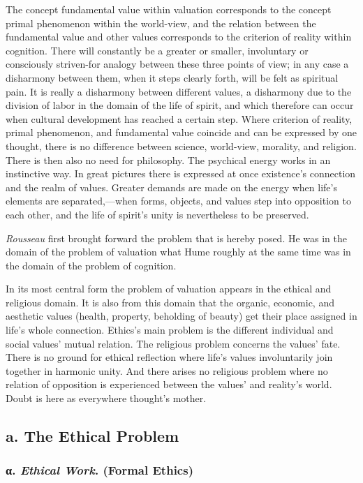 \documentclass[12pt,a4paper]{book}
\newcommand{\opage}[1]{\marginnote{\footnotesize\textit{[#1]}}}
\begin{document}
The concept fundamental value within valuation corresponds to \opage{349}the concept primal phenomenon within
the world-view, and the relation between the fundamental value and other values corresponds to the
criterion of reality within cognition. There will constantly be a greater or smaller, involuntary or
consciously striven-for analogy between these three points of view; in any case a disharmony between
them, when it steps clearly forth, will be felt as spiritual pain. It is really a disharmony between
different values, a disharmony due to the division of labor in the domain of the life of spirit, and
which therefore can occur when cultural development has reached a certain step. Where criterion of
reality, primal phenomenon, and fundamental value coincide and can be expressed by one thought, there
is no difference between science, world-view, morality, and religion. There is then also no need for
philosophy. The psychical energy works in an instinctive way. In great pictures there is expressed at
once existence's connection and the realm of values. Greater demands are made on the energy when
life's elements are separated,---when forms, objects, and values step into opposition to each other,
and the life of spirit's unity is nevertheless to be preserved.

\emph{Rousseau} first brought forward the problem that is hereby posed. He was in the domain of the
problem of valuation what Hume roughly at the same time was in the domain of the problem of cognition.

In its most central form the problem of valuation appears in the ethical and religious domain. It is
also from this domain that the organic, economic, and aesthetic values (health, property, beholding of
beauty) get their place assigned in life's whole connection. Ethics's main problem is the different
individual and social values' mutual relation. The religious problem concerns the values' fate. There
is no ground for ethical reflection where life's values involuntarily join together in harmonic unity.
And there arises no religious problem where no relation of opposition is experienced between the
values' and reality's world. Doubt is here as everywhere thought's mother.

\subsection*{a. The Ethical Problem}

\subsubsection*{α. \emph{Ethical Work}. (Formal Ethics)}
\end{document}
